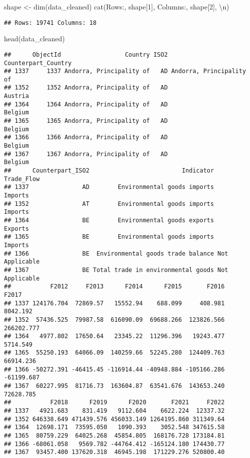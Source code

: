 \documentclass[
]{article}
\newenvironment{Shaded}{\begin{snugshade}}{\end{snugshade}}
\newcommand{\DecValTok}[1]{\textcolor[rgb]{0.00,0.00,0.81}{#1}}
\newcommand{\FunctionTok}[1]{\textcolor[rgb]{0.00,0.00,0.00}{#1}}
\newcommand{\NormalTok}[1]{#1}
\newcommand{\OtherTok}[1]{\textcolor[rgb]{0.56,0.35,0.01}{#1}}
\newcommand{\SpecialCharTok}[1]{\textcolor[rgb]{0.00,0.00,0.00}{#1}}
\newcommand{\StringTok}[1]{\textcolor[rgb]{0.31,0.60,0.02}{#1}}
\begin{document}
\begin{Shaded}
\begin{Highlighting}[]
\NormalTok{shape }\OtherTok{\textless{}{-}} \FunctionTok{dim}\NormalTok{(data\_cleaned)}
\FunctionTok{cat}\NormalTok{(}\StringTok{\textquotesingle{}Rows:\textquotesingle{}}\NormalTok{, shape[}\DecValTok{1}\NormalTok{], }\StringTok{\textquotesingle{}Columns:\textquotesingle{}}\NormalTok{, shape[}\DecValTok{2}\NormalTok{], }\StringTok{\textquotesingle{}}\SpecialCharTok{\textbackslash{}n}\StringTok{\textquotesingle{}}\NormalTok{)}
\end{Highlighting}
\end{Shaded}

\begin{verbatim}
## Rows: 19741 Columns: 18
\end{verbatim}

\begin{Shaded}
\begin{Highlighting}[]
\FunctionTok{head}\NormalTok{(data\_cleaned)}
\end{Highlighting}
\end{Shaded}

\begin{verbatim}
##      ObjectId                  Country ISO2      Counterpart_Country
## 1337     1337 Andorra, Principality of   AD Andorra, Principality of
## 1352     1352 Andorra, Principality of   AD                  Austria
## 1364     1364 Andorra, Principality of   AD                  Belgium
## 1365     1365 Andorra, Principality of   AD                  Belgium
## 1366     1366 Andorra, Principality of   AD                  Belgium
## 1367     1367 Andorra, Principality of   AD                  Belgium
##      Counterpart_ISO2                          Indicator     Trade_Flow
## 1337               AD        Environmental goods imports        Imports
## 1352               AT        Environmental goods imports        Imports
## 1364               BE        Environmental goods exports        Exports
## 1365               BE        Environmental goods imports        Imports
## 1366               BE  Environmental goods trade balance Not Applicable
## 1367               BE Total trade in environmental goods Not Applicable
##           F2012     F2013      F2014      F2015       F2016      F2017
## 1337 124176.704  72869.57   15552.94    688.099     408.981   8042.192
## 1352  57436.525  79987.58  616090.09  69688.266  123826.566 266202.777
## 1364   4977.802  17650.64   23345.22  11296.396   19243.477   5714.549
## 1365  55250.193  64066.09  140259.66  52245.280  124409.763  66914.236
## 1366 -50272.391 -46415.45 -116914.44 -40948.884 -105166.286 -61199.687
## 1367  60227.995  81716.73  163604.87  63541.676  143653.240  72628.785
##           F2018      F2019      F2020       F2021     F2022
## 1337   4921.683    831.419   9112.604    6622.224  12337.32
## 1352 646338.649 471439.576 456033.149 1264195.860 311349.64
## 1364  12698.171  73595.050   1090.393    3052.548 347615.58
## 1365  80759.229  64025.268  45854.805  168176.728 173184.81
## 1366 -68061.058   9569.782 -44764.412 -165124.180 174430.77
## 1367  93457.400 137620.318  46945.198  171229.276 520800.40
\end{verbatim}
\end{document}
